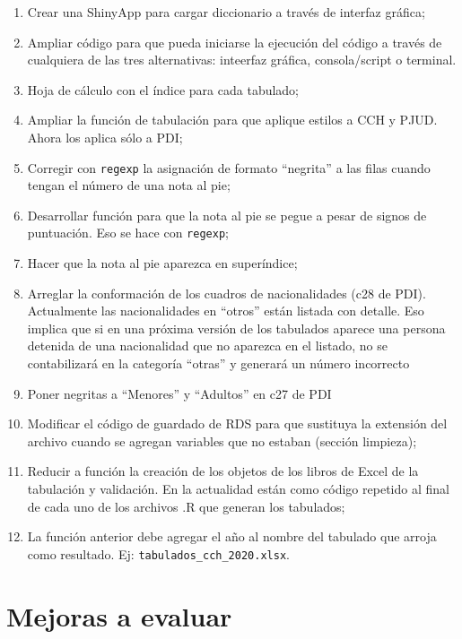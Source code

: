 \documentclass[
  spanish,
]{book}
\begin{document}
\begin{enumerate}
\def\labelenumi{\arabic{enumi}.}
\item
  Crear una ShinyApp para cargar diccionario a través de interfaz gráfica;
\item
  Ampliar código para que pueda iniciarse la ejecución del código a través de cualquiera de las tres alternativas: inteerfaz gráfica, consola/script o terminal.
\item
  Hoja de cálculo con el índice para cada tabulado;
\item
  Ampliar la función de tabulación para que aplique estilos a CCH y PJUD. Ahora los aplica sólo a PDI;
\item
  Corregir con \texttt{regexp} la asignación de formato ``negrita'' a las filas cuando tengan el número de una nota al pie;
\item
  Desarrollar función para que la nota al pie se pegue a pesar de signos de puntuación. Eso se hace con \texttt{regexp};
\item
  Hacer que la nota al pie aparezca en superíndice;
\item
  Arreglar la conformación de los cuadros de nacionalidades (c28 de PDI). Actualmente las nacionalidades en ``otros'' están listada con detalle. Eso implica que si en una próxima versión de los tabulados aparece una persona detenida de una nacionalidad que no aparezca en el listado, no se contabilizará en la categoría ``otras'' y generará un número incorrecto
\item
  Poner negritas a ``Menores'' y ``Adultos'' en c27 de PDI
\item
  Modificar el código de guardado de RDS para que sustituya la extensión del archivo cuando se agregan variables que no estaban (sección limpieza);
\item
  Reducir a función la creación de los objetos de los libros de Excel de la tabulación y validación. En la actualidad están como código repetido al final de cada uno de los archivos .R que generan los tabulados;
\item
  La función anterior debe agregar el año al nombre del tabulado que arroja como resultado. Ej: \texttt{tabulados\_cch\_2020.xlsx}.
\end{enumerate}

\hypertarget{mejoras-a-evaluar}{%
\section*{Mejoras a evaluar}\label{mejoras-a-evaluar}}
\end{document}
